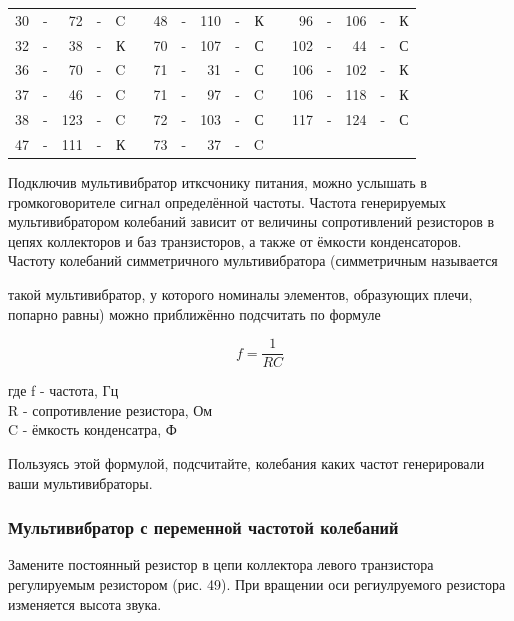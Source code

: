 \documentclass[12pt]{article}
\begin{document}
\hrulefill

\begin{tabular}{r c r c r p{2cm} r c r c r p{2cm} r c r c r}
30 & - &  72 & - & C &     & 48  & - & 110 & - & К &    &  96 & - & 106 & - & К\\
32 & - &  38 & - & К &     & 70  & - & 107 & - & С &    & 102 & - &  44 & - & С\\
36 & - &  70 & - & C &     & 71  & - &  31 & - & С &    & 106 & - & 102 & - & К\\
37 & - &  46 & - & C &     & 71  & - &  97 & - & C &    & 106 & - & 118 & - & К\\
38 & - & 123 & - & C &     & 72  & - & 103 & - & С &    & 117 & - & 124 & - & С\\
47 & - & 111 & - & К &     & 73  & - &  37 & - & C &    &     &   &     &   &  \\
\end{tabular}

\hrulefill

Подключив мультивибратор  итксчонику питания, можно услышать в громкоговорителе сигнал определённой частоты. Частота генерируемых мультивибратором колебаний зависит от величины сопротивлений резисторов в цепях коллекторов и баз транзисторов, а также от ёмкости конденсаторов. Частоту колебаний симметричного мультивибратора (симметричным называется 

\newpage
такой мультивибратор, у которого номиналы элементов, образующих плечи, попарно равны) можно приближённо подсчитать по формуле

\begin{equation}
f = \frac{1}{RC}
\end{equation}

где f - частота, Гц\\
R - сопротивление резистора, Ом\\
C - ёмкость конденсатра, Ф

Пользуясь этой формулой, подсчитайте, колебания каких частот генерировали ваши мультивибраторы.

\subsubsection{Мультивибратор с переменной частотой колебаний}

Замените постоянный резистор в цепи коллектора левого транзистора регулируемым резистором (рис. 49). При вращении оси региулруемого резистора изменяется высота звука.
\end{document}
